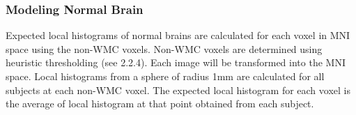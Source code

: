 \subsubsection{Modeling Normal Brain}

Expected local histograms of normal brains are calculated for each voxel in MNI space using the non-WMC voxels. Non-WMC voxels are determined using heuristic thresholding (see 2.2.4). Each image will be transformed into the MNI space. Local histograms from a sphere of radius 1mm are calculated for all subjects at each non-WMC voxel. The expected local histogram for each voxel is the average of local histogram at that point obtained from each subject.

    